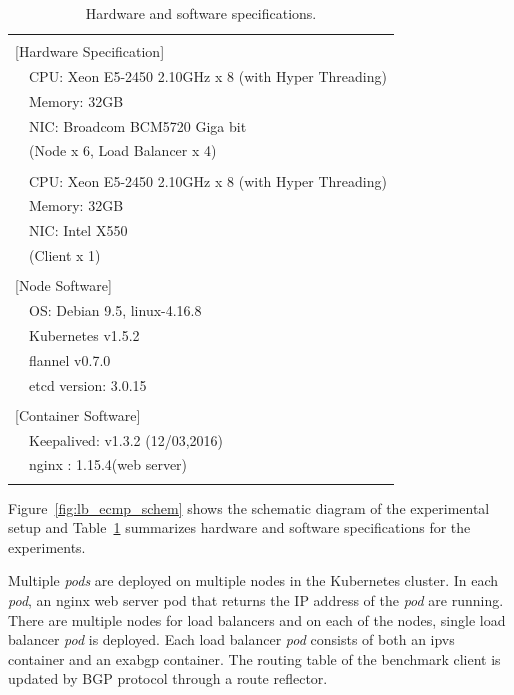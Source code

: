 \begin{table}[b]
  \centering
  \begin{tabular}{ll}
    \hline \\
    \multicolumn{2}{l}{[Hardware Specification]}   \\
    & CPU: Xeon E5-2450 2.10GHz x 8 (with Hyper Threading) \\
    & Memory: 32GB \\
    & NIC: Broadcom BCM5720 Giga bit \\
    & (Node x 6, Load Balancer x 4) \\
    & \\
    & CPU: Xeon E5-2450 2.10GHz x 8 (with Hyper Threading) \\
    & Memory: 32GB \\
    & NIC: Intel X550 \\
    & (Client x 1) \\
    & \\
    \multicolumn{2}{l}{[Node Software]}  \\
    & OS: Debian 9.5, linux-4.16.8 \\
    & Kubernetes v1.5.2 \\
    & flannel v0.7.0 \\
    & etcd version: 3.0.15 \\
    & \\
    \multicolumn{2}{l}{[Container Software]}   \\
    & Keepalived: v1.3.2 (12/03,2016) \\
    & nginx : 1.15.4(web server) \\
    \\ \hline
  \end{tabular}
  \caption{Hardware and software specifications.}
  \label{tab:ecmp-hw_sw_spec}
\end{table}

Figure~\ref{fig:lb_ecmp_schem} shows the schematic diagram of the experimental setup and Table~\ref{tab:ecmp-hw_sw_spec} summarizes hardware and software specifications for the experiments.

Multiple {\em pods} are deployed on multiple nodes in the Kubernetes cluster.
In each {\em pod}, an nginx web server pod that returns the IP address of the {\em pod} are running.
There are multiple nodes for load balancers and on each of the nodes, single load balancer {\em pod} is deployed.
Each load balancer {\em pod} consists of both an ipvs container and an exabgp container.
The routing table of the benchmark client is updated by BGP protocol through a route reflector.

